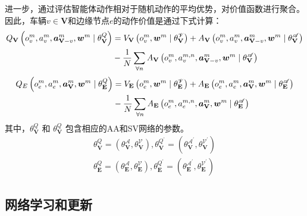 进一步，通过评估智能体动作相对于随机动作的平均优势，对价值函数进行聚合。
因此，车辆$v\in\mathbf{V}$和边缘节点$e$的动作价值是通过下式计算： 
\begin{align}
    Q_{\mathbf{V}}\left({o}_{v}^{m}, {a}_{v}^{m}, \boldsymbol{a}_{\boldsymbol{\mathbf{V}}-v}^{m}, \boldsymbol{w}^{m} \mid \theta_{\mathbf{V}}^{Q} \right) &= V_{\mathbf{V}}\left({o}_{v}^{m}, \boldsymbol{w}^{m} \mid \theta_{\mathbf{V}}^{\mathscr{V}} \right) + A_{\mathbf{V}}\left({o}_{v}^{m},  {a}_{v}^{m}, \boldsymbol{a}_{\boldsymbol{\mathbf{V}}-v}^{m}, \boldsymbol{w}^{m} \mid \theta_{\mathbf{V}}^{\mathscr{A}} \right) \notag \\
    &- \frac{1}{N} \sum_{\forall n} A_{\mathbf{V}}\left({o}_{v}^{m},  {a}_{v}^{m, n}, \boldsymbol{a}_{\boldsymbol{\mathbf{V}}-v}^{m}, \boldsymbol{w}^{m} \mid \theta_{\mathbf{V}}^{\mathscr{A}} \right)
\end{align}
\begin{align}
    Q_{E}\left({o}_{e}^{m},  {a}_{e}^{m}, \boldsymbol{a}_{\boldsymbol{\mathbf{V}}}^{m}, \boldsymbol{w}^{m} \mid \theta_{\mathbf{E}}^{Q} \right) &= V_{\mathbf{E}}\left({o}_{e}^{m}, \boldsymbol{w}^{m} \mid \theta_{\mathbf{E}}^{\mathscr{V}} \right) + A_{\mathbf{E}}\left({o}_{e}^{m},  {a}_{e}^{m}, \boldsymbol{a}_{\boldsymbol{\mathbf{V}}}^{m}, \boldsymbol{w}^{m} \mid \theta_{\mathbf{E}}^{\mathscr{A}} \right) \notag \\
    &- \frac{1}{N} \sum_{\forall n} A_{\mathbf{E}}\left({o}_{e}^{m},  {a}_{e}^{m, n}, \boldsymbol{a}_{\boldsymbol{\mathbf{V}}}^{m}, \boldsymbol{w}^{m} \mid \theta_{\mathbf{E}}^{\mathscr{A}} \right)
\end{align}
其中，$\theta_{\mathbf{V}}^{Q}$ 和 $\theta_{\mathbf{V}}^{Q}$ 包含相应的AA和SV网络的参数。
\begin{align}
	\theta_{\mathbf{V}}^{Q} = (\theta_{\mathbf{V}}^{\mathscr{A}}, \theta_{\mathbf{V}}^{\mathscr{V}}), \theta_{\mathbf{V}}^{Q^{\prime}} = (\theta_{\mathbf{V}}^{\mathscr{A}^{\prime}}, \theta_{\mathbf{V}}^{\mathscr{V}^{\prime}}) \\
	\theta_{\mathbf{E}}^{Q} = (\theta_{\mathbf{E}}^{\mathscr{A}}, \theta_{\mathbf{E}}^{\mathscr{V}}), \theta_{\mathbf{E}}^{Q^{\prime}} = (\theta_{\mathbf{E}}^{\mathscr{A}^{\prime}}, \theta_{\mathbf{E}}^{\mathscr{V}^{\prime}})
\end{align}

\subsection[\hspace{-2pt}网络学习和更新]{{ \hspace{-8pt}网络学习和更新}}

